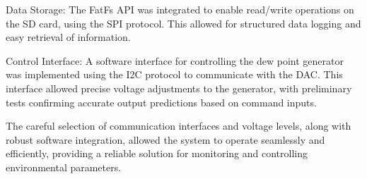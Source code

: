 Data Storage: The FatFs API was integrated to enable read/write operations on the SD card, using the SPI protocol. This allowed for structured data logging and easy retrieval of information.

Control Interface: A software interface for controlling the dew point generator was implemented using the I2C protocol to communicate with the DAC. This interface allowed precise voltage adjustments to the generator, with preliminary tests confirming accurate output predictions based on command inputs.

The careful selection of communication interfaces and voltage levels, along with robust software integration, allowed the system to operate seamlessly and efficiently, providing a reliable solution for monitoring and controlling environmental parameters.